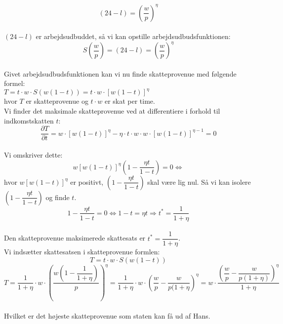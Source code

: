 \documentclass[a4paper, 12pt]{article}
\begin{document}
$$(24-l)=\left( \dfrac{w}{p} \right)^{\eta}$$
\\
$(24-l)$ er arbejdsudbuddet, så vi kan opstille arbejdsudbudsfunktionen: 
$$S \left( \frac{w}{p} \right)=(24-l)=\left( \dfrac{w}{p} \right)^{\eta}$$
\\
Givet arbejdsudbudsfunktionen kan vi nu finde skatteprovenue med følgende formel: 
\\
$T = t\cdot w \cdot S(w(1-t)) = t\cdot w \cdot [w(1-t)]^{\eta}$
\\
hvor $T$ er skatteprovenue og $t\cdot w$ er skat per time.
\\
Vi finder det maksimale skatteprovenue ved at differentiere i forhold til indkomstskatten $t$:
$$\dfrac{\partial T}{\partial t} = w\cdot [w(1-t)]^{\eta} - \eta \cdot t \cdot w \cdot w \cdot [w(1-t)]^{\eta - 1} = 0$$
\\
Vi omskriver dette:
$$w[w(1-t)]^{\eta} \left( 1 - \dfrac{\eta t}{1-t} \right) = 0 \Leftrightarrow$$
hvor $w[w(1-t)]^{\eta}$ er positivt, $ \left( 1 - \dfrac{\eta t}{1-t} \right) $ skal være lig nul. Så vi kan isolere $\left( 1 - \dfrac{\eta t}{1-t} \right)$ og finde $t$.
$$1 - \dfrac{\eta t}{1-t} = 0 \Leftrightarrow 1-t=\eta t \Rightarrow t^{*} =  \dfrac{1}{1 + \eta}$$
\\
Den skatteprovenue maksimerede skattesats er $t^{*} = \dfrac{1}{1 + \eta}$.
\\
Vi indsætter skattesatsen i skatteprovenue formlen:
$$T = t\cdot w \cdot S(w(1-t))$$
$$T = \dfrac{1}{1 + \eta} \cdot w \cdot \left( \dfrac{w(1-\dfrac{1}{1 + \eta})}{p}\right)^{\eta} = \dfrac{1}{1 + \eta} \cdot w \cdot \left( \dfrac{w}{p} - \dfrac{w}{p(1 + \eta} \right)^{\eta} = w \cdot \dfrac{\left( \dfrac{w}{p} - \dfrac{w}{p(1 + \eta)} \right)^{\eta}}{1 + \eta}$$
\\
Hvilket er det højeste skatteprovenue som staten kan få ud af Hans.
\end{document}
